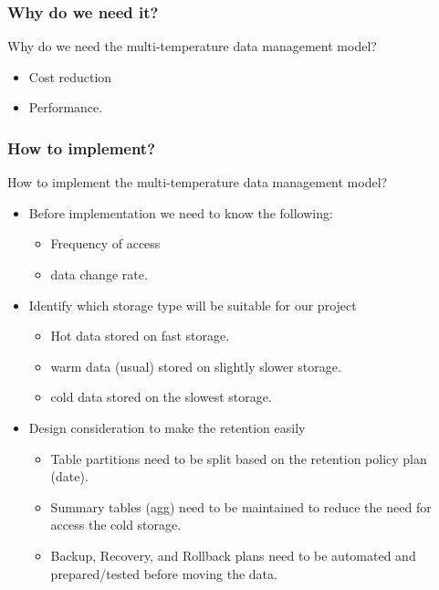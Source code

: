
\begin{frame}
    \frametitle{Why do we need it?}

    \begin{wideitemize}
        \item Why do we need the multi-temperature data management model?
        \begin{itemize}[<+->]
            \item Cost reduction \blue{\faDollar \faDollar \faDollar \faDollar}
            \item Performance.
        \end{itemize}
    \end{wideitemize}
\end{frame}

\begin{frame}
    \frametitle{How to implement?}

    \begin{wideitemize}
        \item How to implement the multi-temperature data management model?
        \begin{itemize}[<+->]
            \item Before implementation we need to know the following:
            \begin{itemize}[<+->]
                \item Frequency of access
                \item data change rate.
            \end{itemize}
            \item Identify which storage type will be suitable for our project
            \begin{itemize}[<+->]
                \item Hot data stored on fast storage.
                \item warm data (usual) stored on slightly slower storage.
                \item cold data stored on the slowest storage.
            \end{itemize}
            \item Design consideration to make the retention easily
            \begin{itemize}[<+->]
                \item Table partitions need to be split based on the retention policy plan \faEdit \space \faArrowCircleORight \space (date).
                \item Summary tables (agg) need to be maintained to reduce the need for access the cold storage.
                \item Backup, Recovery, and Rollback plans need to be automated and prepared/tested before moving the data.
            \end{itemize}
        \end{itemize}
    \end{wideitemize}
\end{frame}


